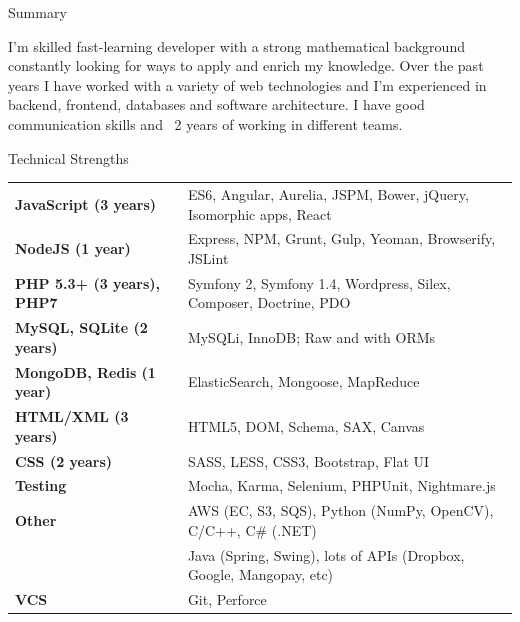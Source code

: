 \documentclass{resume} %
\begin{document}

\begin{rSection}{Summary}

I'm skilled fast-learning developer with a strong mathematical background constantly looking for ways to apply and enrich my knowledge. Over the past years I have worked with a variety of web technologies and I'm experienced in backend, frontend, databases and software architecture. I have good communication skills and ~2 years of working in different teams.

\end{rSection}



\begin{rSection}{Technical Strengths}

\begin{tabular}{ @{} >{\bfseries}l @{\hspace{4ex}} l }
JavaScript (3 years) & ES6, Angular, Aurelia, JSPM, Bower, jQuery, Isomorphic apps, React \\
NodeJS (1 year) & Express, NPM, Grunt, Gulp, Yeoman, Browserify, JSLint \\
PHP 5.3+ (3 years), PHP7 & Symfony 2, Symfony 1.4, Wordpress, Silex, Composer, Doctrine, PDO \\
MySQL, SQLite (2 years) & MySQLi, InnoDB; Raw and with ORMs \\
MongoDB, Redis (1 year) & ElasticSearch, Mongoose, MapReduce \\
HTML/XML (3 years) & HTML5, DOM, Schema, SAX, Canvas \\
CSS (2 years) & SASS, LESS, CSS3, Bootstrap, Flat UI \\
Testing & Mocha, Karma, Selenium, PHPUnit, Nightmare.js \\
Other & AWS (EC, S3, SQS), Python (NumPy, OpenCV), C/C++, C\# (.NET) \\
 & Java (Spring, Swing), lots of APIs (Dropbox, Google, Mangopay, etc) \\
VCS & Git, Perforce \\
\end{tabular}

\end{rSection}
\end{document}
